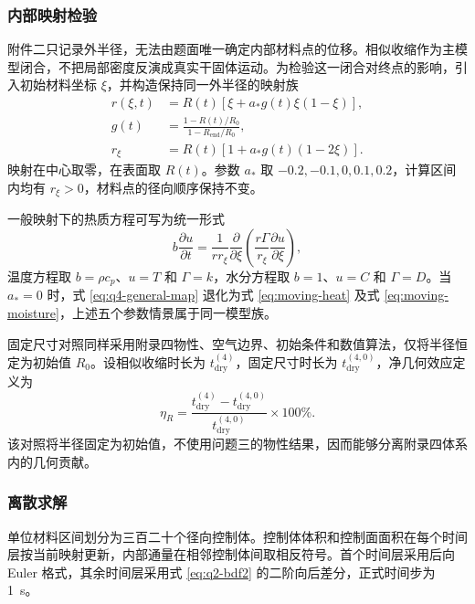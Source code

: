 \documentclass[withoutpreface,bwprint]{cumcmthesis}
\begin{document}
\subsubsection{内部映射检验}

附件二只记录外半径，无法由题面唯一确定内部材料点的位移。相似收缩作为主模型闭合，不把局部密度反演成真实干固体运动。为检验这一闭合对终点的影响，引入初始材料坐标 \(\xi\)，并构造保持同一外半径的映射族
\begin{align}
r(\xi,t)&=R(t)\left[\xi+a_*g(t)\xi(1-\xi)\right],
\label{eq:q4-nonuniform-map}\\
g(t)&=\frac{1-R(t)/R_0}{1-R_{\mathrm{end}}/R_0},\\
r_\xi&=R(t)\left[1+a_*g(t)(1-2\xi)\right].
\label{eq:q4-map-jacobian}
\end{align}
映射在中心取零，在表面取 \(R(t)\)。参数 \(a_*\) 取 \(-0.2,-0.1,0,0.1,0.2\)，计算区间内均有 \(r_\xi>0\)，材料点的径向顺序保持不变。

一般映射下的热质方程可写为统一形式
\begin{equation}
b\frac{\partial u}{\partial t}
=
\frac{1}{r r_\xi}
\frac{\partial}{\partial\xi}
\left(
\frac{r\Gamma}{r_\xi}
\frac{\partial u}{\partial\xi}
\right),
\label{eq:q4-general-map}
\end{equation}
温度方程取 \(b=\rho c_p\)、\(u=T\) 和 \(\Gamma=k\)，水分方程取 \(b=1\)、\(u=C\) 和 \(\Gamma=D\)。当 \(a_*=0\) 时，式 \ref{eq:q4-general-map} 退化为式 \ref{eq:moving-heat} 及式 \ref{eq:moving-moisture}，上述五个参数情景属于同一模型族。

固定尺寸对照同样采用附录四物性、空气边界、初始条件和数值算法，仅将半径\mbox{恒定}为初始值 \(R_0\)。设相似收缩时长为 \(t_{\mathrm{dry}}^{(4)}\)，固定尺寸时长为 \(t_{\mathrm{dry}}^{(4,0)}\)，净几何效应定义为
\begin{equation}
\eta_R=
\frac{t_{\mathrm{dry}}^{(4)}-t_{\mathrm{dry}}^{(4,0)}}
{t_{\mathrm{dry}}^{(4,0)}}\times100\%.
\label{eq:q4-geometry-effect}
\end{equation}
该对照将半径固定为初始值，不使用问题三的物性结果，因而能够分离附录四体系内的几何贡献。

\subsubsection{离散求解}

单位材料区间划分为三百二十个径向控制体。控制体体积和控制面面积在每个时间层按当前映射更新，内部通量在相邻控制体间取相反符号。首个时间层采用后向 Euler 格式，其余时间层采用式 \ref{eq:q2-bdf2} 的二阶向后差分，正式时间步为 \SI{1}{s}。
\end{document}
